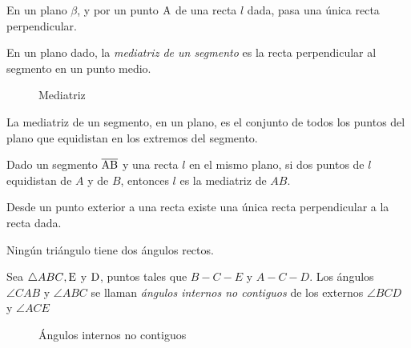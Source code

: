 \begin{theorem}
    En un plano $\beta$, y por un punto $\rm A$ de una recta $l$ dada, pasa una única recta perpendicular.
\end{theorem}

\begin{definition}
    En un plano dado, la \textit{mediatriz de un segmento} es la recta perpendicular al segmento en un punto medio.

    \begin{figure}[!h]
        \centering
        
        \caption{Mediatriz}
        \label{fig:mediatriz}
    \end{figure}
    
\end{definition}

\begin{theorem}
    La mediatriz de un segmento, en un plano, es el conjunto de todos los puntos del plano que equidistan en los extremos del segmento.
\end{theorem}

\begin{theorem}
    Dado un segmento $\overline{\rm AB}$ y una recta $l$ en el mismo plano, si dos puntos de $l$ equidistan de $A$ y de $B$, entonces $l$ es la mediatriz de $AB$.
\end{theorem}

\begin{theorem}
    Desde un punto exterior a una recta existe una única recta perpendicular a la recta dada.
\end{theorem}

\begin{theorem}
    Ningún triángulo tiene dos ángulos rectos.
\end{theorem}

\clearpage

\begin{definition}

Sea $\triangle{ABC}, \rm E$ y $\rm D$, puntos tales que $B-C-E$ y $A-C-D$. Los ángulos $\angle{CAB}$ y $\angle{ABC}$ se llaman \textit{ángulos internos no contiguos} de los externos $\angle{BCD}$ y $\angle{ACE}$

    \begin{figure}[!h]
        \centering
        
        \caption{Ángulos internos no contiguos}
        \label{fig:ang-internos-no-contiguos}
    \end{figure}
    
\end{definition}

